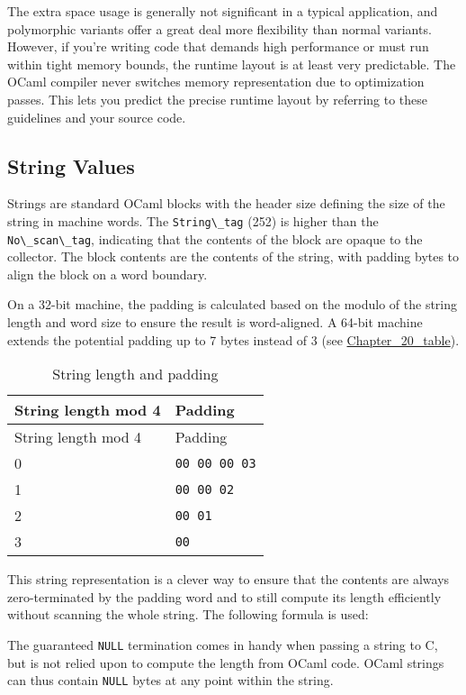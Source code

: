The extra space usage is generally not significant in a typical
application, and polymorphic variants offer a great deal more
flexibility than normal variants. However, if you're writing code that
demands high performance or must run within tight memory bounds, the
runtime layout is at least very predictable. The OCaml compiler never
switches memory representation due to optimization passes. This lets you
predict the precise runtime layout by referring to these guidelines and
your source code.

\hypertarget{string-values}{%
\subsection{String Values}\label{string-values}}

Strings are standard OCaml blocks with the header size defining the size
of the string in machine words. The
\passthrough{\lstinline!String\_tag!} (252) is higher than the
\passthrough{\lstinline!No\_scan\_tag!}, indicating that the contents of
the block are opaque to the collector. The block contents are the
contents of the string, with padding bytes to align the block on a word
boundary. 

On a 32-bit machine, the padding is calculated based on the modulo of
the string length and word size to ensure the result is word-aligned. A
64-bit machine extends the potential padding up to 7 bytes instead of 3
(see
\href{runtime-memory-layout.html\#chapter_20_table}{Chapter\_20\_table}).

\hypertarget{chapter_20_table}{}
\begin{longtable}[]{@{}ll@{}}
\caption{String length and padding}\tabularnewline
\toprule
String length mod 4 & Padding\tabularnewline
\midrule
\endfirsthead
\toprule
String length mod 4 & Padding\tabularnewline
\midrule
\endhead
0 & \passthrough{\lstinline!00 00 00 03!}\tabularnewline
1 & \passthrough{\lstinline!00 00 02!}\tabularnewline
2 & \passthrough{\lstinline!00 01!}\tabularnewline
3 & \passthrough{\lstinline!00!}\tabularnewline
\bottomrule
\end{longtable}

This string representation is a clever way to ensure that the contents
are always zero-terminated by the padding word and to still compute its
length efficiently without scanning the whole string. The following
formula is used:

The guaranteed \passthrough{\lstinline!NULL!} termination comes in handy
when passing a string to C, but is not relied upon to compute the length
from OCaml code. OCaml strings can thus contain
\passthrough{\lstinline!NULL!} bytes at any point within the string.

